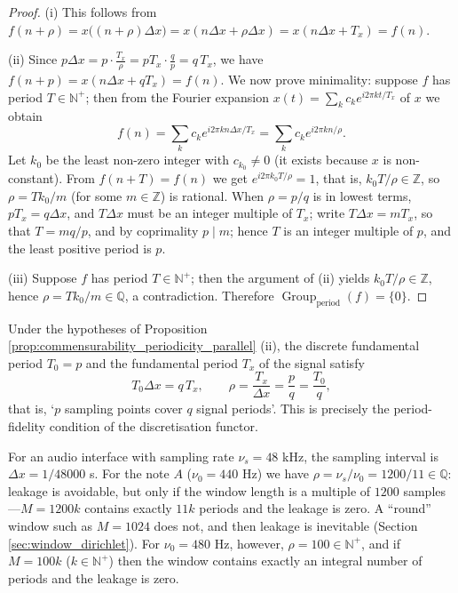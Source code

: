 \begin{proof}
(i) This follows from $f(n+\rho)=x\big((n+\rho)\Delta x\big)=x(n\Delta x+\rho\Delta x)=x(n\Delta x+T_x)=f(n)$.

(ii) Since $p\Delta x=p\cdot\frac{T_x}{\rho}=pT_x\cdot\frac{q}{p}=q\,T_x$, we have $f(n+p)=x(n\Delta x+qT_x)=f(n)$. We now prove minimality: suppose $f$ has period $T\in\mathbb{N}^+$; then from the Fourier expansion $x(t)=\sum_k c_k e^{i2\pi kt/T_x}$ of $x$ we obtain
\[
f(n)=\sum_k c_k e^{i2\pi kn\Delta x/T_x}=\sum_k c_k e^{i2\pi kn/\rho}.
\]
Let $k_0$ be the least non-zero integer with $c_{k_0}\ne0$ (it exists because $x$ is non-constant). From $f(n+T)=f(n)$ we get $e^{i2\pi k_0T/\rho}=1$, that is, $k_0T/\rho\in\mathbb{Z}$, so $\rho=Tk_0/m$ (for some $m\in\mathbb{Z}$) is rational. When $\rho=p/q$ is in lowest terms, $pT_x=q\Delta x$, and $T\Delta x$ must be an integer multiple of $T_x$; write $T\Delta x=mT_x$, so that $T=mq/p$, and by coprimality $p\mid m$; hence $T$ is an integer multiple of $p$, and the least positive period is $p$.

(iii) Suppose $f$ has period $T\in\mathbb{N}^+$; then the argument of (ii) yields $k_0T/\rho\in\mathbb{Z}$, hence $\rho=Tk_0/m\in\mathbb{Q}$, a contradiction. Therefore $\operatorname{Group}_{\mathrm{period}}(f)=\{0\}$.
\end{proof}

\begin{corollary}\label{cor:sampling_period_relation_parallel}
Under the hypotheses of Proposition \ref{prop:commensurability_periodicity_parallel} (ii), the discrete fundamental period $T_0=p$ and the fundamental period $T_x$ of the signal satisfy
\[
T_0\Delta x=q\,T_x,\qquad \rho=\frac{T_x}{\Delta x}=\frac{p}{q}=\frac{T_0}{q},
\]
that is, `$p$ sampling points cover $q$ signal periods'. This is precisely the period-fidelity condition of the discretisation functor.
\end{corollary}

\begin{example}\label{ex:digital_signal_modelling}
For an audio interface with sampling rate $\nu_s=48$ kHz, the sampling interval is $\Delta x=1/48000$ s. For the note $A$ ($\nu_0=440$ Hz) we have $\rho=\nu_s/\nu_0=1200/11\in\mathbb{Q}$: leakage is avoidable, but only if the window length is a multiple of $1200$ samples---$M=1200k$ contains exactly $11k$ periods and the leakage is zero. A ``round'' window such as $M=1024$ does not, and then leakage is inevitable (Section \ref{sec:window_dirichlet}). For $\nu_0=480$ Hz, however, $\rho=100\in\mathbb{N}^+$, and if $M=100k$ ($k\in\mathbb{N}^+$) then the window contains exactly an integral number of periods and the leakage is zero.
\end{example}

